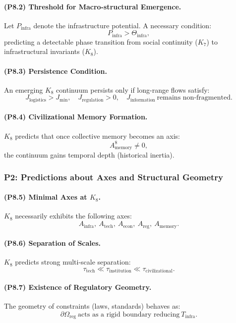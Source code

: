 \paragraph{(P8.2) Threshold for Macro-structural Emergence.}
Let $P_{\mathrm{infra}}$ denote the infrastructure potential.  
A necessary condition:
\[
P_{\mathrm{infra}} > \Theta_{\mathrm{infra}},
\]
predicting a detectable phase transition from social continuity ($K_7$) 
to infrastructural invariants ($K_8$).

\paragraph{(P8.3) Persistence Condition.}
An emerging $K_8$ continuum persists only if long-range flows satisfy:
\[
J_{\mathrm{logistics}} > J_{\mathrm{min}},
\quad  
J_{\mathrm{regulation}} > 0,
\quad
J_{\mathrm{information}} \ \text{remains non-fragmented}.
\]

\paragraph{(P8.4) Civilizational Memory Formation.}
$K_8$ predicts that once collective memory becomes an axis:
\[
A_{\mathrm{memory}}^8 \neq 0,
\]
the continuum gains temporal depth (historical inertia).

\subsubsection{P2: Predictions about Axes and Structural Geometry}

\paragraph{(P8.5) Minimal Axes at \texorpdfstring{$K_8$}{K_8}.}
$K_8$ necessarily exhibits the following axes:
\[
A_{\mathrm{infra}},\ 
A_{\mathrm{tech}},\ 
A_{\mathrm{econ}},\ 
A_{\mathrm{reg}},\ 
A_{\mathrm{memory}}.
\]

\paragraph{(P8.6) Separation of Scales.}
$K_8$ predicts strong multi-scale separation:
\[
\tau_{\mathrm{tech}} \ll \tau_{\mathrm{institution}} \ll \tau_{\mathrm{civilizational}}.
\]

\paragraph{(P8.7) Existence of Regulatory Geometry.}
The geometry of constraints (laws, standards) behaves as:
\[
\partial\Omega_{\mathrm{reg}} 
\ \text{acts as a rigid boundary reducing} \ 
T_{\mathrm{infra}}.
\]

